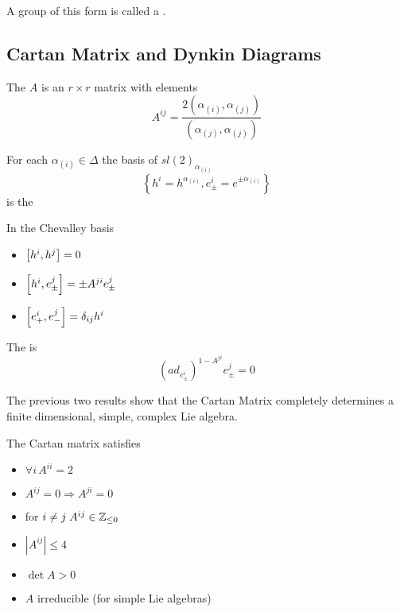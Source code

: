\documentclass{article}
\begin{document}
\begin{remark}
	A group of this form is called a .
\end{remark}


\subsection{Cartan Matrix and Dynkin Diagrams}

\begin{definition}
	The  $A$ is an $r \times r$ matrix with elements 
	\[
	A^{ij}=\frac{2(\alpha_{(i)},\alpha_{(j)})}{(\alpha_{(j)},\alpha_{(j)})}
	\]
\end{definition}

\begin{definition}
	For each $\alpha_{(i)}\in\Delta$ the basis of $sl(2)_{\alpha_{(i)}}$
	\[
	\left\{ h^i=h^{\alpha_{(i)}}, e^i_\pm=e^{\pm\alpha_{(i)}} \right\}
	\]
	is the 
\end{definition}

\begin{theorem}
	In the Chevalley basis
	\begin{itemize}
		\item $\comm[h^i]{h^j}=0$
		\item $\comm[h^i]{e^j_\pm}=\pm A^{ji} e^j_\pm$
		\item $\comm[e^i_+]{e^j_-}=\delta_{ij} h^i$
	\end{itemize}
\end{theorem}

\begin{theorem}
	The  is 
	\[
	\left( ad_{e^i_\pm}\right)^{1-A^{ji}} e^j_\pm=0
	\]
\end{theorem}

\begin{idea}
	The previous two results show that the Cartan Matrix completely determines a finite dimensional, simple, complex Lie algebra. 
\end{idea}

\begin{theorem}
	The Cartan matrix satisfies
	\begin{itemize}
		\item $\forall i \, A^{ii}=2$
		\item $A^{ij}=0 \Rightarrow A^{ji}=0$
		\item for $i \neq j \; A^{ij}\in\mbb{Z}_{\leq0}$
		\item $|A^{ij}|\leq4$
		\item $\det{A}>0$
		\item $A$ irreducible (for simple Lie algebras)
	\end{itemize}
\end{theorem}
\end{document}
